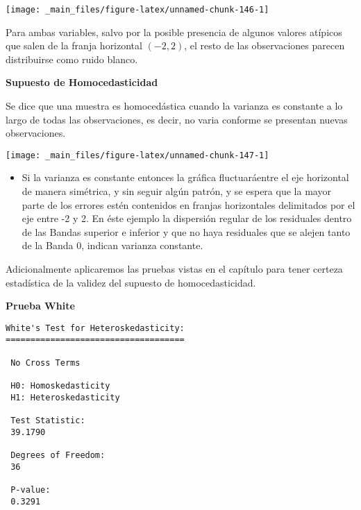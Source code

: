 \documentclass[
  a4paper,
  oneside,
  openany]{book}
\newenvironment{Shaded}{\begin{snugshade}}{\end{snugshade}}
\newcommand{\DataTypeTok}[1]{\textcolor[rgb]{0.13,0.29,0.53}{#1}}
\newcommand{\DecValTok}[1]{\textcolor[rgb]{0.00,0.00,0.81}{#1}}
\newcommand{\KeywordTok}[1]{\textcolor[rgb]{0.13,0.29,0.53}{\textbf{#1}}}
\newcommand{\NormalTok}[1]{#1}
\newcommand{\OperatorTok}[1]{\textcolor[rgb]{0.81,0.36,0.00}{\textbf{#1}}}
\providecommand{\tightlist}{%
  \setlength{\itemsep}{0pt}\setlength{\parskip}{0pt}}
\begin{document}
\begin{center}\texttt{[image: \_main\_files/figure-latex/unnamed-chunk-146-1]} \end{center}

Para ambas variables, salvo por la posible presencia de algunos valores atípicos que salen de la franja horizontal \((-2,2)\), el resto de las observaciones parecen distribuirse como ruido blanco.

\textbf{Supuesto de Homocedasticidad}

Se dice que una muestra es homocedástica cuando la varianza es constante a lo largo de todas las observaciones, es decir, no varia conforme se presentan nuevas observaciones.

\begin{center}\texttt{[image: \_main\_files/figure-latex/unnamed-chunk-147-1]} \end{center}

\begin{itemize}
\tightlist
\item
  Si la varianza es constante entonces la gráfica fluctuaráentre el eje horizontal de manera simétrica, y sin seguir algún patrón, y se espera que la mayor parte de los errores estén contenidos en franjas horizontales delimitados por el eje entre -2 y 2. En éste ejemplo la dispersión regular de los residuales dentro de las Bandas superior e inferior y que no haya residuales que se alejen tanto de la Banda 0, indican varianza constante.
\end{itemize}

Adicionalmente aplicaremos las pruebas vistas en el capítulo para tener certeza estadística de la validez del supuesto de homocedasticidad.

\textbf{Prueba White}

\begin{Shaded}
\end{Shaded}

\begin{verbatim}
White's Test for Heteroskedasticity:
==================================== 

 No Cross Terms

 H0: Homoskedasticity
 H1: Heteroskedasticity

 Test Statistic:
 39.1790 

 Degrees of Freedom:
 36 

 P-value:
 0.3291 
\end{verbatim}
\end{document}
